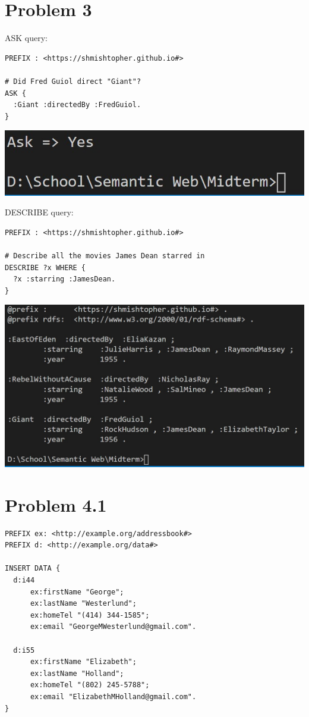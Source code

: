 \documentclass{article}
\newenvironment{problem}[1]{
  \nobreak\section*{Problem #1}
}{}
\begin{document}
\begin{problem}{3}
    ASK query:
    \begin{verbatim}
PREFIX : <https://shmishtopher.github.io#>

# Did Fred Guiol direct "Giant"?
ASK {
  :Giant :directedBy :FredGuiol.
}
    \end{verbatim}
    \includegraphics{images/9.jpg}
  

    \pagebreak
    DESCRIBE query:
    \begin{verbatim}
PREFIX : <https://shmishtopher.github.io#>

# Describe all the movies James Dean starred in
DESCRIBE ?x WHERE {
  ?x :starring :JamesDean.
}
    \end{verbatim}
    \includegraphics{images/10.jpg}
  \end{problem}

  \pagebreak
  \begin{problem}{4.1}
    \begin{verbatim}
PREFIX ex: <http://example.org/addressbook#>
PREFIX d: <http://example.org/data#>

INSERT DATA {
  d:i44
      ex:firstName "George";
      ex:lastName "Westerlund";
      ex:homeTel "(414) 344-1585";
      ex:email "GeorgeMWesterlund@gmail.com".
  
  d:i55
      ex:firstName "Elizabeth";
      ex:lastName "Holland";
      ex:homeTel "(802) 245-5788";
      ex:email "ElizabethMHolland@gmail.com".
}
    \end{verbatim}
  \end{problem}
\end{document}
